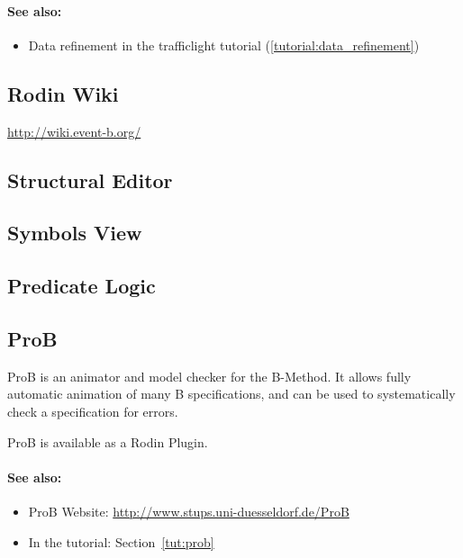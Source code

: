 \paragraph*{See also:}
\begin{itemize}
\item Data refinement in the trafficlight tutorial (\ref{tutorial:data_refinement})
\end{itemize}

\subsection{Rodin Wiki}
\label{rodin_wiki}

\url{http://wiki.event-b.org/}

\subsection{Structural Editor}
\label{structural_editor}

\subsection{Symbols View}
\label{symbols_view}

\subsection{Predicate Logic}
\label{predicate_logic}

\subsection{ProB}
\label{prob}

ProB is an animator and model checker for the B-Method. It allows fully automatic animation of many B specifications, and can be used to systematically check a specification for errors. 

ProB is available as a Rodin Plugin.

\paragraph*{See also:}
\begin{itemize}
\item ProB Website: \url{http://www.stups.uni-duesseldorf.de/ProB}
\item In the tutorial: Section~\ref{tut:prob}
\end{itemize}



